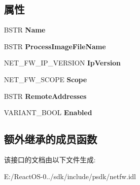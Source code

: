 \subsection*{属性}
\begin{DoxyCompactItemize}
\item 
\mbox{\label{interface_i_net_fw_authorized_application_a7f2ca5b5ba01e4db09b94564764d2156}} 
B\+S\+TR {\bfseries Name}
\item 
\mbox{\label{interface_i_net_fw_authorized_application_ad59d8d7a320d19204472546ff9f1549a}} 
B\+S\+TR {\bfseries Process\+Image\+File\+Name}
\item 
\mbox{\label{interface_i_net_fw_authorized_application_a2d83700c5875d278d0ef933eed58385d}} 
N\+E\+T\+\_\+\+F\+W\+\_\+\+I\+P\+\_\+\+V\+E\+R\+S\+I\+ON {\bfseries Ip\+Version}
\item 
\mbox{\label{interface_i_net_fw_authorized_application_aecdc9cfe1f2353296c10cd2909368ab0}} 
N\+E\+T\+\_\+\+F\+W\+\_\+\+S\+C\+O\+PE {\bfseries Scope}
\item 
\mbox{\label{interface_i_net_fw_authorized_application_a4d1a1bb3b2386967725a9cad49faaa42}} 
B\+S\+TR {\bfseries Remote\+Addresses}
\item 
\mbox{\label{interface_i_net_fw_authorized_application_a6a8cc977a28b0bee638f176255ae9a2e}} 
V\+A\+R\+I\+A\+N\+T\+\_\+\+B\+O\+OL {\bfseries Enabled}
\end{DoxyCompactItemize}
\subsection*{额外继承的成员函数}


该接口的文档由以下文件生成\+:\begin{DoxyCompactItemize}
\item 
E\+:/\+React\+O\+S-\/0../sdk/include/psdk/netfw.\+idl\end{DoxyCompactItemize}
